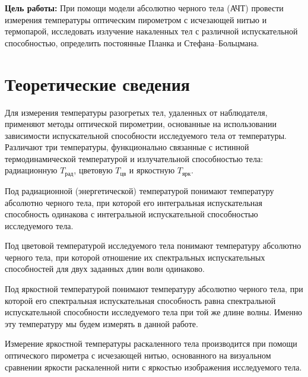 
\newcommand{\tocsection}[1]{\section*{#1} \addcontentsline{toc}{section}{#1}}
\renewcommand{\cftsecleader}{\cftdotfill{\cftdotsep}}
\def\fillandplacepagenumber{%
	\par\pagestyle{empty}%
	\vbox to 0pt{\vss}\vfill
	\vbox to 0pt{\baselineskip0pt
		\hbox to\linewidth{\hss}%
		\baselineskip\footskip
		\hbox to\linewidth{%
			\hfil\thepage\hfil}\vss}}
		


	
	\newpage
	
	\tableofcontents
	
	
	
	\newpage
	\textbf{Цель работы:} При помощи модели абсолютно черного тела (АЧТ) провести измерения температуры оптическим пирометром с исчезающей нитью и термопарой, исследовать излучение накаленных тел с различной испускательной способностью, определить постоянные Планка и Стефана–Больцмана.
	
	
	\tocsection{Теоретические сведения}
	
	Для измерения температуры разогретых тел, удаленных от наблюдателя, применяют методы оптической пирометрии, основанные на использовании зависимости испускательной способности исследуемого тела от температуры. Различают три температуры, функционально связанные с истинной термодинамической температурой и излучательной способностью тела: радиационную $T_\text{рад}$, цветовую $T_\text{цв}$ и яркостную $T_\text{ярк}$.

	
	Под радиационной (энергетической) температурой понимают температуру абсолютно черного тела, при которой его интегральная испускательная способность одинакова с интегральной испускательной способностью исследуемого тела.

	Под цветовой температурой исследуемого тела понимают температуру абсолютно черного тела, при которой отношение их спектральных испускательных способностей для двух заданных длин волн одинаково.
	
	Под яркостной температурой понимают температуру абсолютно черного тела, при которой его спектральная испускательная способность равна спектральной испускательной способности исследуемого тела при той же длине волны. Именно эту температуру мы будем измерять в данной работе.

	
	Измерение яркостной температуры раскаленного тела производится при помощи оптического пирометра с исчезающей нитью, основанного на визуальном сравнении яркости раскаленной нити с яркостью изображения исследуемого тела. 
	

